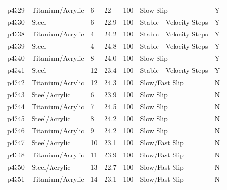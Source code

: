 \documentclass[11pt]{article}
\begin{document}
\begin{center}
\begin{tabular}{ | l l p{1.6cm} p{1.7cm} p{1.6cm} p{4cm} p{0.5cm} | }
p4329      & Titanium/Acrylic & 6                   & 22              & 100                   & Slow Slip                       & Y              \\
p4330      & Steel            & 6                   & 22.9            & 100                   & Stable - Velocity Steps         & Y              \\
p4338      & Titanium/Acrylic & 4                   & 24.2            & 100                   & Stable - Velocity Steps         & Y              \\
p4339      & Steel            & 4                   & 24.8            & 100                   & Stable - Velocity Steps         & Y              \\
p4340	     & Titanium/Acrylic & 8                   & 24.0            & 100                   & Slow Slip                       & Y              \\
p4341	     & Steel            & 12                  & 23.4            & 100                   & Stable - Velocity Steps         & Y              \\
p4342	     & Titanium/Acrylic & 12                  & 24.3            & 100                   & Slow/Fast Slip                  & N              \\
p4343	     & Steel/Acrylic    & 6                   & 23.9            & 100                   & Slow Slip                       & N              \\
p4344	     & Titanium/Acrylic & 7                   & 24.5            & 100                   & Slow Slip                       & N              \\
p4345	     & Steel/Acrylic    & 8                   & 24.2            & 100                   & Slow Slip                       & N              \\
p4346	     & Titanium/Acrylic & 9                   & 24.2            & 100                   & Slow Slip                       & N              \\
p4347	     & Steel/Acrylic    & 10                  & 23.1            & 100                   & Slow/Fast Slip                  & N              \\
p4348	     & Titanium/Acrylic & 11                  & 23.9            & 100                   & Slow/Fast Slip                  & N              \\
p4350	     & Steel/Acrylic    & 13                  & 22.7            & 100                   & Slow/Fast Slip                  & N              \\
p4351	     & Titanium/Acrylic & 14                  & 23.1            & 100                   & Slow/Fast Slip                  & N              \\


    \hline
    \end{tabular}
\end{center}
\end{document}
